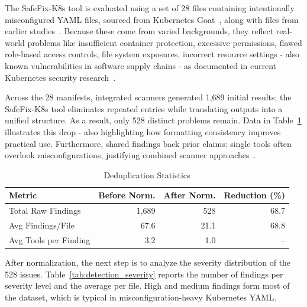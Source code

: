 \documentclass[preprint,12pt]{elsarticle}
\begin{document}
The SafeFix-K8s tool is evaluated using a set of 28 files containing intentionally misconfigured YAML files, sourced from Kubernetes Goat~\cite{madhuakula_kubernetes_goat}, along with files from earlier studies~\cite{shamim2024technoeducational,malul2024genkubesec,ye2025llmsecconfig,dellimmagine2023kubehound}. Because these come from varied backgrounds, they reflect real-world problems like insufficient container protection, excessive permissions, flawed role-based access controls, file system exposures, incorrect resource settings - also known vulnerabilities in software supply chains - as documented in current Kubernetes security research~\cite{rahman2023k8s,dellimmagine2023kubehound,shamim2024technoeducational}.

Across the 28 manifests, integrated scanners generated 1,689 initial results; the SafeFix-K8s tool eliminates repeated entries while translating outputs into a unified structure. As a result, only 528 distinct problems remain. Data in Table~\ref{tab:deduplication} illustrates this drop - also highlighting how formatting consistency improves practical use. Furthermore, shared findings back prior claims: single tools often overlook misconfigurations, justifying combined scanner approaches~\cite{sivaraman2023mlk8s,dellimmagine2023kubehound}.


\begin{table}[htbp]
\centering
\caption{Deduplication Statistics}
\label{tab:deduplication}
\small
\setlength{\tabcolsep}{5pt}
\renewcommand{\arraystretch}{1.1}
\begin{tabular}{lrrr}
\hline
\textbf{Metric} & \textbf{Before Norm.} & \textbf{After Norm.} & \textbf{Reduction (\%)} \\
\hline
Total Raw Findings & 1,689 & 528 & 68.7 \\
Avg Findings/File & 67.6 & 21.1 & 68.8 \\
Avg Tools per Finding & 3.2 & 1.0 & -- \\
\hline
\end{tabular}
\end{table}







After normalization, the next step is to analyze the severity distribution of the 528 issues. Table~\ref{tab:detection_severity} reports the number of findings per severity level and the average per file. High and medium findings form most of the dataset, which is typical in misconfiguration-heavy Kubernetes YAML.
\end{document}
